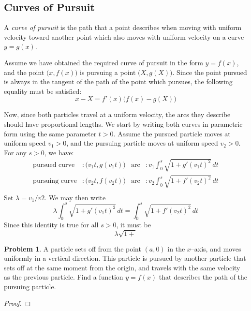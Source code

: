 \documentclass{scrartcl}
\theoremstyle{definition}
\newtheorem*{problem*}{Problem}
\begin{document}
\subsection*{Curves of Pursuit}
A \emph{curve of pursuit} is the path that a point describes
when moving with uniform velocity toward another point which also
moves with uniform velocity on a curve $y=g(x)$.

Assume we have obtained the required curve of pursuit in the form $y=f(x)$, and the point $\big(x,f(x)\big)$ is pursuing a point $\big(X,g(X)\big)$.  Since the point pursued is always in the tangent of the path of the point which pursues, the following equality must be satisfied:
\begin{equation*}
	x - X = f'(x)\big(f(x)-g(X)\big)
\end{equation*}

Now, since both particles travel at a uniform velocity, the arcs they describe should have proportional lengths.  We start by writing both curves in parametric form using the same parameter $t>0$. Assume the pursued particle moves at uniform speed $v_1>0$, and the pursuing particle moves at uniform speed $v_2>0$.  For any $s>0$, we have:
\begin{align*}
	\text{pursued curve} &: \big(v_1 t, g(v_1 t)\big) & \text{arc} &: v_1 \int_0^s \sqrt{1 + g'(v_1 t)^2}\, dt \\
	\text{pursuing curve} &: \big(v_2 t, f(v_2 t)\big) & \text{arc} &: v_2 \int_0^s \sqrt{1 + f'(v_2 t)^2}\, dt \\
\end{align*}
Set $\lambda = v_1/v2$.  We may then write
\begin{equation*}
	\lambda \int_0^s \sqrt{1 + g'(v_1 t)^2}\, dt = \int_0^s \sqrt{1 + f'(v_2 t)^2}\, dt
\end{equation*}
Since this identity is true for all $s>0$, it must be
\begin{equation*}
	\lambda \sqrt{1+}
\end{equation*}
\begin{problem*}
A particle sets off from the point $(a,0)$ in the $x$--axis, and moves uniformly in a vertical direction.  This particle is pursued by another particle that sets off at the same moment from the origin, and travels with the same velocity as the previous particle.  Find a function $y=f(x)$ that describes the path of the pursuing particle.
\end{problem*}

\begin{proof}

\end{proof}
\end{document}
